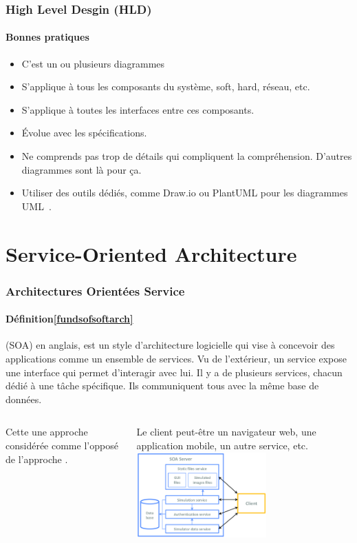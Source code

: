 \documentclass{beamer}
\begin{document}
    \begin{frame}
        \transdissolve
        \frametitle{High Level Desgin (HLD)}
        \framesubtitle{Bonnes pratiques}
        \begin{itemize}
            \item C'est un ou plusieurs diagrammes
            \item S'applique à tous les composants du système, soft, hard, réseau, etc.
            \item S'applique à toutes les interfaces entre ces composants.
            \item Évolue avec les spécifications.
            \item Ne comprends pas trop de détails qui compliquent la compréhension.
            D'autres diagrammes sont là pour ça.
            \item Utiliser des outils dédiés, comme Draw.io ou PlantUML pour les diagrammes UML~.
        \end{itemize}
    \end{frame}


    \section{Service-Oriented Architecture}\label{sec:soa}

    \begin{frame}
        \transdissolve
        \frametitle{Architectures Orientées Service}
        \framesubtitle{Définition\cref{fundsofsoftarch}}
         (SOA) en anglais, est un style d'architecture logicielle qui vise à concevoir des applications comme un ensemble de services.
        \bigbreak
        Vu de l'extérieur, un service expose une interface qui permet d'interagir avec lui.
        Il y a de plusieurs services, chacun dédié à une tâche spécifique.
        Ils communiquent tous avec la même base de données.
        \begin{columns}
            Cette une approche considérée comme l'opposé de l'approche .

            Le client peut-être un navigateur web, une application mobile, un autre service, etc.
            \centering
            \includegraphics[width=5cm]{image/soa-server}
        \end{columns}
    \end{frame}
\end{document}

